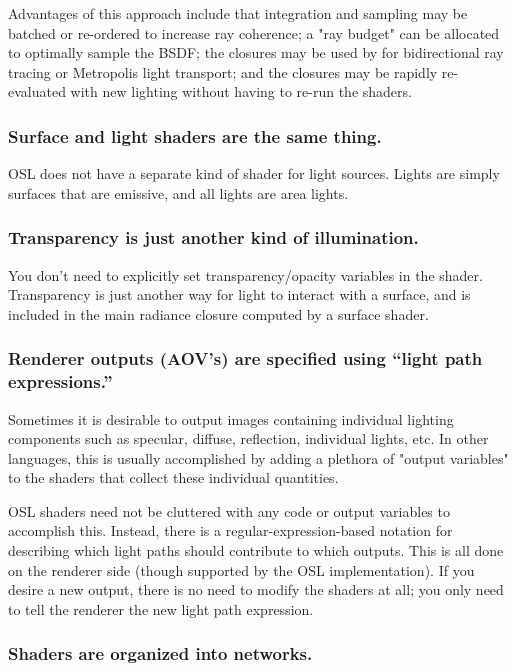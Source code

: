 \documentclass[11pt,letterpaper]{book}
\begin{document}
  Advantages of this approach include that integration and sampling may
  be batched or re-ordered to increase ray coherence; a "ray budget" can
  be allocated to optimally sample the BSDF; the closures may be used by
  for bidirectional ray tracing or Metropolis light transport; and the
  closures may be rapidly re-evaluated with new lighting without having
  to re-run the shaders.

\subsubsection*{Surface and light shaders are the same thing.}

  OSL does not have a separate kind of shader for light sources.  Lights
  are simply surfaces that are emissive, and all lights are area lights.

\subsubsection*{Transparency is just another kind of illumination.}

  You don't need to explicitly set transparency/opacity variables in the
  shader.  Transparency is just another way for light to interact with a
  surface, and is included in the main radiance closure computed by a
  surface shader.

\subsubsection*{Renderer outputs (AOV's) are specified using ``light path expressions.''}

  Sometimes it is desirable to output images containing individual
  lighting components such as specular, diffuse, reflection, individual
  lights, etc.  In other languages, this is usually accomplished by
  adding a plethora of "output variables" to the shaders that collect
  these individual quantities.

  OSL shaders need not be cluttered with any code or output variables to
  accomplish this.  Instead, there is a regular-expression-based
  notation for describing which light paths should contribute to which
  outputs.  This is all done on the renderer side (though supported by
  the OSL implementation).  If you desire a new output, there is no need
  to modify the shaders at all; you only need to tell the renderer the
  new light path expression.

\subsubsection*{Shaders are organized into networks.}
\end{document}
